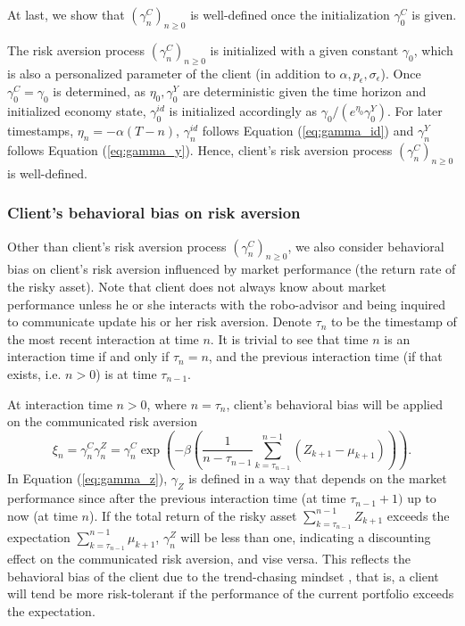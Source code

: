 At last, we show that $(\gamma_n^C)_{n\geq0}$ is well-defined once the initialization $\gamma_0^C$ is given.

The risk aversion process $(\gamma_n^C)_{n\geq0}$ is initialized with a given constant $\gamma_0$, which is also a personalized parameter of the client (in addition to $\alpha,p_\epsilon,\sigma_\epsilon$). Once $\gamma_0^C=\gamma_0$ is determined, as $\eta_0,\gamma_0^Y$ are deterministic given the time horizon and initialized economy state, $\gamma_0^{id}$ is initialized accordingly as $\gamma_0/(e^{\eta_0}\gamma_0^{Y})$. For later timestamps, $\eta_n=-\alpha(T-n)$, $\gamma_n^{id}$ follows Equation (\ref{eq:gamma_id}) and $\gamma_n^Y$ follows Equation (\ref{eq:gamma_y}). Hence, client's risk aversion process $(\gamma_n^C)_{n\geq0}$ is well-defined.

\subsubsection{Client's behavioral bias on risk aversion}

Other than client's risk aversion process $(\gamma_n^C)_{n\geq 0}$, we also consider behavioral bias on client's risk aversion influenced by market performance (the return rate of the risky asset). Note that client does not always know about market performance unless he or she interacts with the robo-advisor and being inquired to communicate update his or her risk aversion. Denote $\tau_n$ to be the timestamp of the most recent interaction at time $n$. It is trivial to see that time $n$ is an interaction time if and only if $\tau_n=n$, and the previous interaction time (if that exists, i.e. $n>0$) is at time $\tau_{n-1}$.

At interaction time $n>0$, where $n=\tau_n$, client's behavioral bias will be applied on the communicated risk aversion \begin{equation}\label{eq:gamma_z}
    \xi_n=\gamma_n^C\gamma_n^Z=\gamma_n^C\exp{\left(-\beta\left(\frac1{n-\tau_{n-1}}\sum_{k=\tau_{n-1}}^{n-1}(Z_{k+1}-\mu_{k+1})\right)\right)}.
\end{equation}
In Equation (\ref{eq:gamma_z}), $\gamma_Z$ is defined in a way that depends on the market performance since after the previous interaction time (at time $\tau_{n-1}+1)$ up to now (at time $n$). If the total return of the risky asset $\sum_{k=\tau_{n-1}}^{n-1} Z_{k+1}$ exceeds the expectation $\sum_{k=\tau_{n-1}}^{n-1}\mu_{k+1}$, $\gamma_n^Z$ will be less than one, indicating a discounting effect on the communicated risk aversion, and vise versa. This reflects the behavioral bias of the client due to the trend-chasing mindset \cite{oechssler2009cognitive}, that is, a client will tend be more risk-tolerant if the performance of the current portfolio exceeds the expectation.


